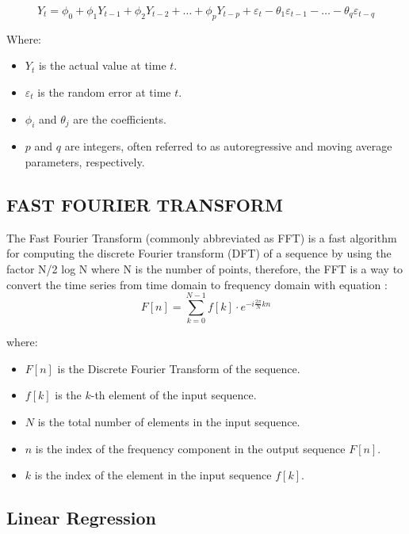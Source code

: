 \documentclass{ieeeojies}
\begin{document}
\begin{equation*}
Y_t = \phi_0 + \phi_1 Y_{t-1} + \phi_2 Y_{t-2} + \ldots + \phi_p Y_{t-p} + \varepsilon_t - \theta_1 \varepsilon_{t-1} - \ldots - \theta_q \varepsilon_{t-q}
\end{equation*}

Where:
\begin{itemize}
    \item $Y_t$ is the actual value at time $t$.
    \item $\varepsilon_t$ is the random error at time $t$.
    \item $\phi_i$ and $\theta_j$ are the coefficients.
    \item $p$ and $q$ are integers, often referred to as autoregressive and moving average parameters, respectively.
\end{itemize}

\subsection{FAST FOURIER TRANSFORM}
The Fast Fourier Transform (commonly abbreviated as
FFT) is a fast algorithm for computing the discrete Fourier
transform (DFT) of a sequence \cite{Gillian} by using the factor N/2
log N where N is the number of points, therefore, the FFT is a
way to convert the time series from time domain to frequency
domain \cite{Musbah} with equation \cite{Roberts}: 
\[
F[n] = \sum_{k=0}^{N-1} f[k] \cdot e^{-i \frac{2\pi}{N} kn}
\]

where:
\begin{itemize}
    \item $F[n]$ is the Discrete Fourier Transform of the sequence.
    \item $f[k]$ is the $k$-th element of the input sequence.
    \item $N$ is the total number of elements in the input sequence.
    \item $n$ is the index of the frequency component in the output sequence $F[n]$.
    \item $k$ is the index of the element in the input sequence $f[k]$.
\end{itemize}

\subsection{Linear Regression}
\end{document}
